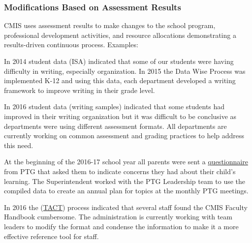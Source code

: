 \subsubsection{Modifications Based on Assessment Results}



\begin{findings}
CMIS uses assessment results to make changes to the school program, professional development activities, and resource allocations demonstrating a results-driven continuous process.
Examples:

In 2014  student data (ISA)  indicated that some of our students were having difficulty in writing, especially organization. In 2015 the Data Wise Process was implemented K-12 and using this data, each department developed a writing framework to improve writing in their grade level.

In 2016 student data (writing samples) indicated that some students had improved in their writing organization but it was difficult to be conclusive as departments were using different assessment formats. All departments are currently working on common assessment and grading practices to help address this need. 

At the beginning of the 2016-17 school year all parents were sent a \href{https://docs.google.com/a/cmis.ac.th/document/d/15NgGowXXl_-_PW3vi8Al-8O8ibZQfgWht9ywRgfjjCY/edit?usp=sharing}{questionnaire} from PTG that asked them to indicate concerns they had about their child’s learning. The Superintendent worked with the PTG Leadership team to use the compiled data to create an annual plan for topics at the monthly PTG meetings.

In 2016 the (\href{https://docs.google.com/a/cmis.ac.th/document/d/14nhwcw8xo3i-23Q-WUxo6KJ_c8yFKu-jTdCctt4MFcs/edit?usp=sharing}{TACT}) process indicated that several staff found the CMIS Faculty Handbook cumbersome. The administration  is currently working with team leaders to modify the format and condense the information to make it a more effective reference tool for staff. 


\end{findings}
